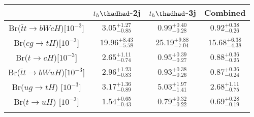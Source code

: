 \begin{tabular}{cccc} \toprule\toprule
 & $t_h\thadhad$-2j & $t_h\thadhad$-3j & Combined\\\midrule
Br($\bar{t}t\to bWcH$)[$10^{-3}$]    & $3.05^{+1.27}_{-0.85}$ & $0.99^{+0.40}_{-0.28}$ & $0.92^{+0.38}_{-0.26}$\\
Br($cg\to tH$)[$10^{-3}]$            & $19.96^{+8.43}_{-5.58}$ & $25.19^{+9.88}_{-7.04}$ & $15.68^{+6.38}_{-4.38}$\\
Br($t\to cH$)[$10^{-3}$]             & $2.65^{+1.11}_{-0.74}$ & $0.95^{+0.39}_{-0.27}$ & $0.88^{+0.36}_{-0.25}$\\
Br($\bar{t}t\to bWuH$)[$10^{-3}$]    & $2.96^{+1.23}_{-0.83}$ & $0.93^{+0.38}_{-0.26}$ & $0.87^{+0.36}_{-0.24}$\\
Br($ug\to tH$) [$10^{-3}$]           & $3.17^{+1.36}_{-0.89}$ & $5.03^{+1.97}_{-1.41}$ & $2.68^{+1.11}_{-0.75}$\\
Br($t\to uH$)  [$10^{-3}$]           & $1.54^{+0.65}_{-0.43}$ & $0.79^{+0.32}_{-0.22}$ & $0.69^{+0.28}_{-0.19}$\\
\bottomrule\bottomrule\\
\end{tabular}
